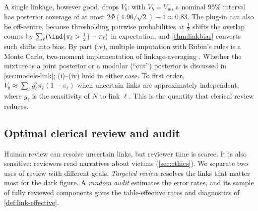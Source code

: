 A single linkage, however good, drops $V_b$: with $V_b=V_w$, a nominal $95\%$ interval has posterior coverage of at most $2\Phi(1.96/\sqrt2)-1\approx0.83$. The plug-in can also be off-centre, because thresholding pairwise probabilities at $\frac12$ shifts the overlap counts by $\sum_\ell(\ind{\pi_\ell>\frac12}-\pi_\ell)$ in expectation, and \cref{thm:linkbias} converts such shifts into bias. By part (iv), multiple imputation with Rubin's rules is a Monte Carlo, two-moment implementation of linkage-averaging \citep{sadinle2018}. Whether the mixture is a joint posterior or a modular (``cut'') posterior \citep{plummer2015} is discussed in \cref{sec:models-link}; (i)--(iv) hold in either case. To first order, $V_b\approx\sum_\ell g_\ell^2\pi_\ell(1-\pi_\ell)$ when uncertain links are approximately independent, where $g_\ell$ is the sensitivity of $N$ to link $\ell$. This is the quantity that clerical review reduces.

\subsection{Optimal clerical review and audit}\label{sec:link-review}

Human review can resolve uncertain links, but reviewer time is scarce. It is also sensitive: reviewers read narratives about victims (\cref{sec:ethics}). We separate two uses of review with different goals. \emph{Targeted review} resolves the links that matter most for the dark figure. A \emph{random audit} estimates the error rates, and its sample of fully reviewed components gives the table-effective rates and diagnostics of \cref{def:link-effective}.

